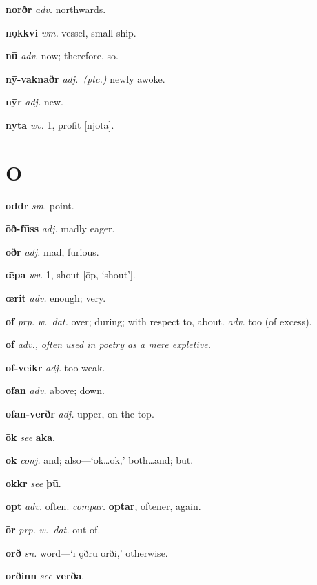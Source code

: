 \documentclass[12pt,letterpaper]{book}
\newcommand\emptypage{\clearpage{\pagestyle{empty}\cleardoublepage}}
\begin{document}
\noindent
\textbf{norðr} \textit{adv.} northwards.

\noindent
\textbf{nǫkkvi} \textit{wm.} vessel, small ship.

\noindent
\textbf{nū} \textit{adv.} now; therefore, so.

\noindent
\textbf{nȳ-vaknaðr} \textit{adj.\ (ptc.)} newly awoke.

\noindent
\textbf{nȳr} \textit{adj.} new.

\noindent
\textbf{nȳta} \textit{wv.} 1, profit [njōta].

\emptypage

\chapter*{O}

\noindent
\textbf{oddr} \textit{sm.} point.

\noindent
\textbf{ōð-fūss} \textit{adj.} madly eager.

\noindent
\textbf{ōðr} \textit{adj.} mad, furious.

\noindent
\textbf{œ̄pa} \textit{wv.} 1, shout [ōp, `shout'].

\noindent
\textbf{œrit} \textit{adv.} enough; very.

\noindent
\textbf{of} \textit{prp.} \textit{w.\ dat.} over; during; with respect
	to, about.  \textit{adv.} too (of excess).

\noindent
\textbf{of} \textit{adv.,} \textit{often used in poetry as a mere expletive.}

\noindent
\textbf{of-veikr} \textit{adj.} too weak.

\noindent
\textbf{ofan} \textit{adv.} above; down.

\noindent
\textbf{ofan-verðr} \textit{adj.} upper, on the top.

\noindent
\textbf{ōk} \textit{} \textit{see} \textbf{aka}.

\noindent
\textbf{ok} \textit{conj.} and; also---`ok\ldots ok,' both\ldots and; but.

\noindent
\textbf{okkr} \textit{} \textit{see} \textbf{þū}.

\noindent
\textbf{opt} \textit{adv.} often.  \textit{compar.} \textbf{optar}, oftener,
	again.

\noindent
\textbf{ōr} \textit{prp.} \textit{w.\ dat.} out of.

\noindent
\textbf{orð} \textit{sn.} word---`ī ǫðru orði,' otherwise.

\noindent
\textbf{orðinn} \textit{} \textit{see} \textbf{verða}.
\end{document}
